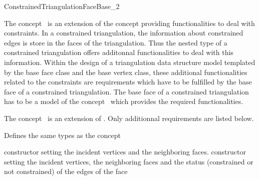 

\begin{ccRefConcept}{ConstrainedTriangulationFaceBase_2}


\ccDefinition
The concept \ccRefName\ is  an extension of the concept
providing functionalities to deal with
constraints.  
In a constrained triangulation,
the information about constrained edges is store in the 
faces of the triangulation.
Thus the nested 
type of a constrained triangulation offers
additonnal functionalities to deal with this information.
Within the design of a triangulation data structure
model templated by the base face class and the base vertex class,
these additional functionalities related to the constraints
are requirements which have to be fulfilled
by the base face of  a constrained triangulation.
The base face of a constrained triangulation
has to be a model of the concept
\ccRefName\ which provides the
required functionalities.

The concept \ccRefName\ is  an extension of 
. Only additionnal
requirements are listed below.

\ccTypes
Defines the same types as the  concept


\ccCreation
{}  %

\ccGlue
{}
\ccGlue
{} 
{constructor setting the incident vertices and the neighboring faces.}
\ccGlue
{}
 {constructor setting the incident vertices, the neighboring faces and 
the status (constrained or not constrained) of the edges of the face}
                   


\end{ccRefConcept}
